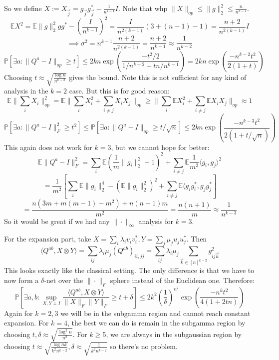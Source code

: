 \documentclass{article}
\newcommand{\E}{\mathbb{E}}
\renewcommand{\Pr}{\mathbb{P}}
\begin{document}
So we define $X := X_{\vec{j}} = g_{\vec{j}} g_{\vec{j}}^{*} - \frac{1}{n^{k-1}} I$. Note that whp $\|X\|_{op} \leq \|g\|_{2}^{2} \leq \frac{n}{n^{k-1}}$. 
\[ \E X^{2} = \E \|g\|_{2}^{2} g g^{*} - \left( \frac{I}{n^{k-1}} \right)^{2} = \frac{I}{n^{2(k-1)}} (3 + (n-1) - 1) = \frac{n+2}{n^{2(k-1)}} I  \]
\[ \implies \sigma^{2} = n^{k-1} \frac{n+2}{n^{2(k-1)}} = \frac{n+2}{n^{k-1}} \approx \frac{1}{n^{k-2}}  \]
\[ \Pr [ \exists a: \|Q^{a} - I\|_{op} \geq t ] \leq 2 k n \exp \left( \frac{-t^{2}/2}{1/n^{k-2} + t n/ n^{k-1}}  \right) = 2 k n \exp \left( \frac{- n^{k-2} t^{2}}{2(1 + t)} \right)  \]
Choosing $t \approx \sqrt{\frac{\log n}{n^{k-2}}}$ gives the bound. Note this is not sufficient for any kind of analysis in the $k=2$ case. But this is for good reason:
\[ \E \|\sum_{i} X_{i}\|_{op}^{2} = \E \|\sum_{i} X_{i}^{2} + \sum_{i \neq j} X_{i} X_{j}\|_{op} \geq \|\sum_{i} \E X_{i}^{2} + \sum_{i \neq j} \E X_{i} X_{j} \|_{op} \approx 1   \]
\[ \Pr [ \exists a: \|Q^{a} - I\|_{F}^{2} \geq t^{2} ] \leq \Pr [ \exists a: \|Q^{a} - I\|_{op} \geq t/\sqrt{n} ] \leq 2kn \exp\left(\frac{-n^{k-3} t^{2}}{2(1+t/\sqrt{n})} \right) \]
This again does not work for $k=3$, but we cannot hope for better:
\[ \E\|Q^{a} - I\|_{F}^{2} = \sum_{i} \E (\frac{1}{m} \|g_{i}\|_{2}^{2} - 1)^{2} + \sum_{i \neq j} \E \frac{1}{m^{2}} \langle g_{i}, g_{j} \rangle^{2} \]
\[ = \frac{1}{m^{2}} [ \sum_{i} \E \|g_{i}\|_{2}^{4} - (\E \|g_{i}\|_{2}^{2})^{2} + \sum_{i \neq j} \E \langle g_{i} g_{i}^{*}, g_{j} g_{j}^{*} ] \]
\[ = \frac{n(3m + m(m-1) - m^{2}) + n(n-1)m}{m^{2}} = \frac{n(n+1)}{m} \approx \frac{1}{n^{k-3}}
\]
So it would be great if we had any $\|\cdot\|_{\infty}$ analysis for $k=3$. 


For the expansion part, take $X = \sum_{i} \lambda_{i} v_{i} v_{i}^{*}, Y = \sum_{j} \mu_{j} u_{j} u_{j}^{*}$. Then 
\[ \langle Q^{ab}, X \otimes Y \rangle = \sum_{ij} \lambda_{i} \mu_{j} (Q^{ab})_{ii,jj} = \sum_{ij} \lambda_{i} \mu_{j} \sum_{\vec{k} \in [n]^{k-2}} g_{ij\vec{k}}^{2}   \]
This looks exactly like the classical setting. The only difference is that we have to now form a $\delta$-net over the $\|\cdot\|_{F}$ sphere instead of the Euclidean one. Therefore:
\[ \Pr [ \exists a,b:  \sup_{X,Y \perp I} \frac{\langle Q^{ab}, X \otimes Y \rangle}{\|X\|_{F} \|Y\|_{F}} \geq t + \delta ] \leq 2 k^{2} \left( \frac{1}{\delta} \right)^{n^{2}} \exp \left( \frac{- n^{k} t^{2}}{4(1 + 2tn)} \right)    \]
Again for $k=2,3$ we will be in the subgamma region and cannot reach constant expansion. For $k = 4$, the best we can do is remain in the subgamma region by choosing $t,\delta \approx \sqrt{\frac{\log^{2} n}{n^{2}} }$. For $k \geq 5$, we are always in the subgaussian region by choosing $t \approx \sqrt{\frac{\log nk}{k^{2} n^{k-2}}}, \delta \approx \sqrt{\frac{1}{k^{2} n^{k-2}}}$ so there's no problem. 
\end{document}

